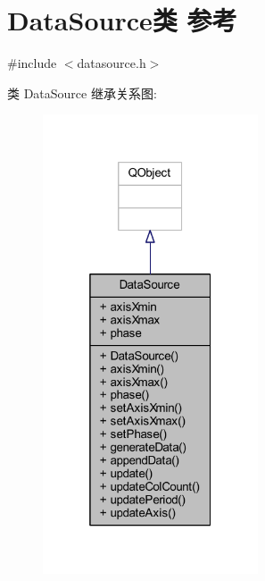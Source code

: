\hypertarget{class_data_source}{}\section{Data\+Source类 参考}
\label{class_data_source}


{\ttfamily \#include $<$datasource.\+h$>$}



类 Data\+Source 继承关系图\+:
\nopagebreak
\begin{figure}[H]
\begin{center}
\leavevmode
\includegraphics[width=181pt]{class_data_source__inherit__graph}
\end{center}
\end{figure}


